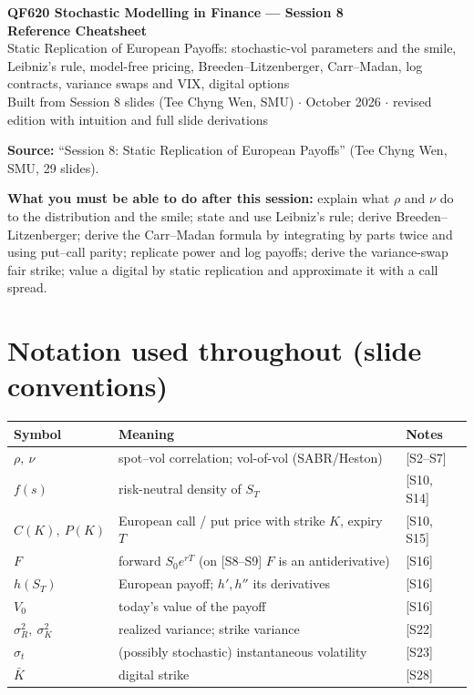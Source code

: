 \documentclass[10pt]{article}
\begin{document}
\begin{center}
{\LARGE\bfseries QF620 Stochastic Modelling in Finance --- Session 8\\[2pt] Reference Cheatsheet}\\[6pt]
{\large Static Replication of European Payoffs: stochastic-vol parameters and the smile, Leibniz's rule, model-free pricing, Breeden--Litzenberger, Carr--Madan, log contracts, variance swaps and VIX, digital options}\\[4pt]
{\small Built from Session 8 slides (Tee Chyng Wen, SMU) $\cdot$ October 2026 $\cdot$ revised edition with intuition and full slide derivations}
\end{center}
\tableofcontents
\vspace{4pt}
\textbf{Source:} ``Session 8: Static Replication of European Payoffs'' (Tee Chyng Wen, SMU, 29 slides).

\legend

\textbf{What you must be able to do after this session:} explain what $\rho$ and $\nu$ do to the distribution and the smile; state and use Leibniz's rule; derive Breeden--Litzenberger; derive the Carr--Madan formula by integrating by parts twice and using put--call parity; replicate power and log payoffs; derive the variance-swap fair strike; value a digital by static replication and approximate it with a call spread.

\section*{Notation used throughout (slide conventions)}
{\small\renewcommand{\arraystretch}{1.12}
\begin{tabularx}{\linewidth}{@{}l X l@{}}\toprule
Symbol & Meaning & Notes\\\midrule
$\rho,\ \nu$ & spot--vol correlation; vol-of-vol (SABR/Heston) & [S2--S7]\\
$f(s)$ & risk-neutral density of $S_T$ & [S10, S14]\\
$C(K),\ P(K)$ & European call / put price with strike $K$, expiry $T$ & [S10, S15]\\
$F$ & forward $S_0e^{rT}$ (on [S8--S9] $F$ is an antiderivative) & [S16]\\
$h(S_T)$ & European payoff; $h',h''$ its derivatives & [S16]\\
$V_0$ & today's value of the payoff & [S16]\\
$\sigma_R^2,\ \sigma_K^2$ & realized variance; strike variance & [S22]\\
$\sigma_t$ & (possibly stochastic) instantaneous volatility & [S23]\\
$\bar K$ & digital strike & [S28]\\\bottomrule
\end{tabularx}}
\end{document}
